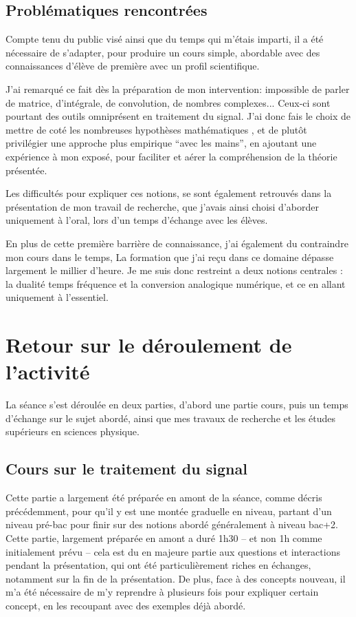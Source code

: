 \documentclass[12pt]{article}
\begin{document}
\subsection{Problématiques rencontrées}

Compte tenu du public visé ainsi que du temps qui m'étais imparti, il a été nécessaire de s'adapter, pour produire un cours simple, abordable avec des connaissances d'élève de première avec un profil scientifique.

J'ai remarqué ce fait dès la préparation de mon intervention: impossible de parler de matrice, d'intégrale, de convolution, de nombres complexes... Ceux-ci sont pourtant des outils omniprésent en traitement du signal. J'ai donc fais le choix de mettre de coté les nombreuses hypothèses mathématiques , et de plutôt privilégier une approche plus empirique ``avec les mains'', en ajoutant une expérience à mon exposé, pour faciliter et aérer la compréhension de la théorie présentée.

Les difficultés pour expliquer ces notions, se sont également retrouvés dans la présentation de mon travail de recherche, que j'avais ainsi choisi d'aborder uniquement à l'oral, lors d'un temps d'échange avec les élèves.

En plus de cette première barrière de connaissance, j'ai également du contraindre mon cours dans le temps, La formation que j'ai reçu dans ce domaine dépasse largement le millier d'heure. Je me suis donc restreint a deux notions centrales : la dualité temps fréquence et la conversion analogique numérique, et ce en allant uniquement à l'essentiel.


\section{Retour sur le déroulement de l'activité}

La séance s'est déroulée en deux parties, d'abord une partie cours, puis un temps d'échange sur le sujet abordé, ainsi que mes travaux de recherche et les études supérieurs en sciences physique.
\subsection{Cours sur le traitement du signal}


Cette partie a largement été préparée en amont de la séance, comme décris précédemment, pour qu'il y est une montée graduelle en niveau, partant d'un niveau pré-bac pour finir sur des notions abordé généralement à niveau bac+2.
Cette partie, largement préparée en amont a duré 1h30 -- et non 1h comme initialement prévu -- cela est du en majeure partie aux questions et interactions pendant la présentation, qui ont été particulièrement riches en échanges, notamment sur la fin de la présentation. De plus, face à des concepts nouveau, il m'a été nécessaire de m'y reprendre à plusieurs fois pour expliquer certain concept, en les recoupant avec des exemples déjà abordé.
   
\end{document}
